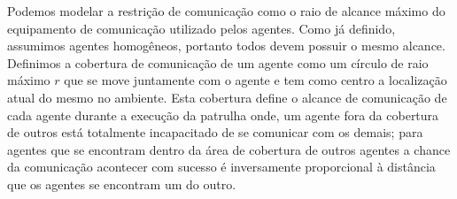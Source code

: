 Podemos modelar a restrição de comunicação como o raio de alcance máximo do 
equipamento de comunicação utilizado pelos agentes. Como já definido, assumimos 
agentes homogêneos, portanto todos devem possuir o mesmo alcance. Definimos a 
cobertura de comunicação de um agente como um círculo de raio máximo $r$ que se 
move juntamente com o agente e tem como centro a localização atual do mesmo no 
ambiente. Esta cobertura define o alcance de comunicação de cada agente durante 
a execução da patrulha onde, um agente fora da cobertura de outros está 
totalmente incapacitado de se comunicar com os demais; para agentes que se 
encontram dentro da área de cobertura de outros agentes a chance da comunicação 
acontecer com sucesso é inversamente proporcional à distância que os agentes se 
encontram um do outro.

